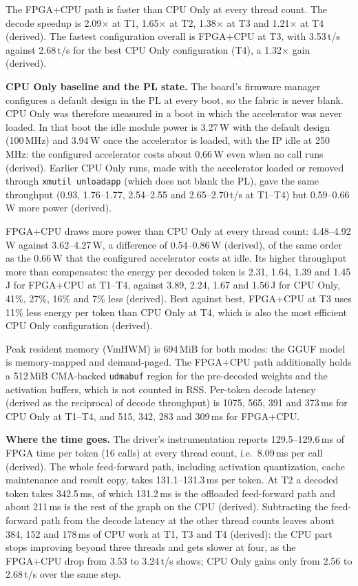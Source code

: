 The FPGA+CPU path is faster than CPU Only at every thread count. The decode speedup is
2.09$\times$ at T1, 1.65$\times$ at T2, 1.38$\times$ at T3 and 1.21$\times$ at T4
(derived). The fastest configuration overall is FPGA+CPU at T3, with 3.53\,t/s against
2.68\,t/s for the best CPU Only configuration (T4), a 1.32$\times$ gain (derived).

\textbf{CPU Only baseline and the PL state.} The board's firmware manager configures a
default design in the PL at every boot, so the fabric is never blank. CPU Only was
therefore measured in a boot in which the accelerator was never loaded. In that boot
the idle module power is 3.27\,W with the default design (100\,MHz) and 3.94\,W once
the accelerator is loaded, with the IP idle at 250\,MHz: the configured accelerator
costs about 0.66\,W even when no call runs (derived). Earlier CPU Only runs, made with
the accelerator loaded or removed through \texttt{xmutil unloadapp} (which does not
blank the PL), gave the same throughput (0.93, 1.76--1.77, 2.54--2.55 and
2.65--2.70\,t/s at T1--T4) but 0.59--0.66\,W more power (derived).

FPGA+CPU draws more power than CPU Only at every thread count: 4.48--4.92\,W against
3.62--4.27\,W, a difference of 0.54--0.86\,W (derived), of the same order as the
0.66\,W that the configured accelerator costs at idle. Its higher throughput more than compensates: the energy per decoded token is
2.31, 1.64, 1.39 and 1.45\,J for FPGA+CPU at T1--T4, against 3.89, 2.24, 1.67 and
1.56\,J for CPU Only, 41\%, 27\%, 16\% and 7\% less (derived). Best against best,
FPGA+CPU at T3 uses 11\% less energy per token than CPU Only at T4, which is also the
most efficient CPU Only configuration (derived).

Peak resident memory (VmHWM) is 694\,MiB for both modes: the GGUF model is memory-mapped
and demand-paged. The FPGA+CPU path additionally holds a 512\,MiB CMA-backed
\texttt{udmabuf} region for the pre-decoded weights and the activation buffers, which
is not counted in RSS. Per-token decode latency (derived as the reciprocal of decode
throughput) is 1075, 565, 391 and 373\,ms for CPU Only at T1--T4, and 515, 342, 283 and
309\,ms for FPGA+CPU.

\textbf{Where the time goes.} The driver's instrumentation reports 129.5--129.6\,ms of
FPGA time per token (16 calls) at every thread count, i.e.\ 8.09\,ms per call
(derived). The whole feed-forward path, including activation quantization, cache
maintenance and result copy, takes 131.1--131.3\,ms per token. At T2 a decoded token
takes 342.5\,ms, of which 131.2\,ms is the offloaded feed-forward path and about
211\,ms is the rest of the graph on the CPU (derived). Subtracting the feed-forward
path from the decode latency at the other thread counts leaves about 384, 152 and
178\,ms of CPU work at T1, T3 and T4 (derived): the CPU part stops improving beyond
three threads and gets slower at four, as the FPGA+CPU drop from 3.53 to 3.24\,t/s
shows; CPU Only gains only from 2.56 to 2.68\,t/s over the same step.

